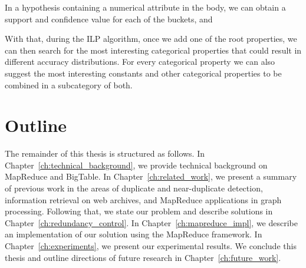 In a hypothesis containing a numerical attribute in the body, we can obtain a support and confidence value for each of the buckets, and 

With that, during the ILP algorithm, once we add one of the root properties, we can then search for the most interesting categorical properties that could result in different accuracy distributions. For every categorical property we can also suggest the most interesting constants and other categorical properties to be combined in a subcategory of both.

\section{Outline}

The remainder of this thesis is structured as follows. In
Chapter~\ref{ch:technical_background}, we provide technical background on
MapReduce and BigTable. In Chapter~\ref{ch:related_work}, we present a
summary of previous work in the areas of duplicate and near-duplicate detection,
information retrieval on web archives, and MapReduce applications in graph
processing. Following that, we state our problem and describe solutions in
Chapter~\ref{ch:redundancy_control}. In Chapter~\ref{ch:mapreduce_impl}, we
describe an implementation of our solution using the MapReduce framework. In
Chapter~\ref{ch:experiments}, we present our experimental results. We conclude
this thesis and outline directions of future research in Chapter~\ref{ch:future_work}.





